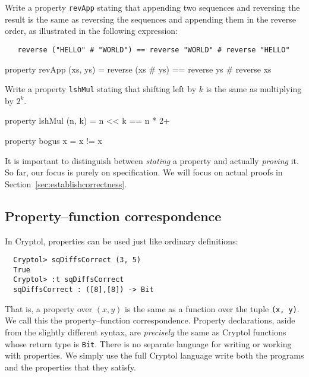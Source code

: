 \begin{Exercise}\label{ex:thm:2}
  Write a property {\tt revApp} stating that appending two sequences
  and reversing the result is the same as reversing the sequences and
  appending them in the reverse order, as illustrated in the following
  expression:\indReverse\indAppend
\begin{Verbatim}
   reverse ("HELLO" # "WORLD") == reverse "WORLD" # reverse "HELLO"
\end{Verbatim}
\end{Exercise}
\begin{Answer}\indReverse\indAppend
\begin{code}
  property revApp (xs, ys) = reverse (xs # ys)
                             == reverse ys # reverse xs
\end{code}
\end{Answer}

\begin{Exercise}\label{ex:thm:3}
  Write a property {\tt lshMul} stating that shifting left by $k$ is
  the same as multiplying by $2^k$.
\end{Exercise}
\begin{Answer}
\begin{code}
  property lshMul (n, k) = n << k == n * 2^^k
\end{code}
\end{Answer}

\begin{code}
  property bogus x = x != x
\end{code}
It is important to distinguish between \emph{stating} a property and
actually \emph{proving} it. So far, our focus is purely on
specification. We will focus on actual proofs in
Section~\ref{sec:establishcorrectness}.

\subsection{Property--function correspondence}\indThmFuncCorr
\label{sec:prop-funct-corr}

In Cryptol, properties can be used just like ordinary definitions:
\begin{Verbatim}
  Cryptol> sqDiffsCorrect (3, 5)
  True
  Cryptol> :t sqDiffsCorrect
  sqDiffsCorrect : ([8],[8]) -> Bit
\end{Verbatim}
That is, a property over {\tt$(x, y)$} is the same as a function over
the tuple {\tt (x, y)}. We call this the property--function
correspondence. Property declarations, aside from the slightly
different syntax, are \emph{precisely} the same as Cryptol functions
whose return type is \texttt{Bit}. There is no separate language for
writing or working with properties. We simply use the full Cryptol
language write both the programs and the properties that they satisfy.

